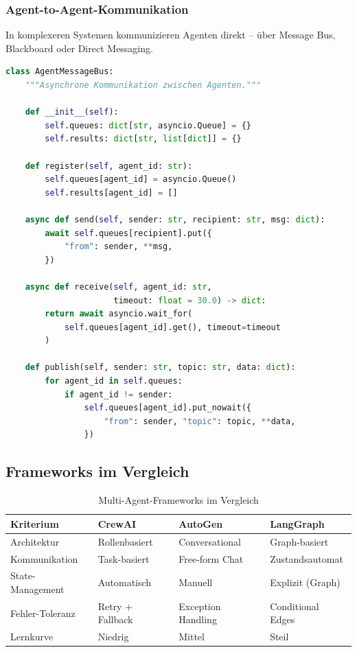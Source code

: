 \subsubsection{Agent-to-Agent-Kommunikation}

In komplexeren Systemen kommunizieren Agenten direkt -- über Message Bus, Blackboard oder Direct Messaging.

\begin{lstlisting}[language=Python, caption=Message-Bus-fuer-Agenten]
class AgentMessageBus:
    """Asynchrone Kommunikation zwischen Agenten."""

    def __init__(self):
        self.queues: dict[str, asyncio.Queue] = {}
        self.results: dict[str, list[dict]] = {}

    def register(self, agent_id: str):
        self.queues[agent_id] = asyncio.Queue()
        self.results[agent_id] = []

    async def send(self, sender: str, recipient: str, msg: dict):
        await self.queues[recipient].put({
            "from": sender, **msg,
        })

    async def receive(self, agent_id: str,
                      timeout: float = 30.0) -> dict:
        return await asyncio.wait_for(
            self.queues[agent_id].get(), timeout=timeout
        )

    def publish(self, sender: str, topic: str, data: dict):
        for agent_id in self.queues:
            if agent_id != sender:
                self.queues[agent_id].put_nowait({
                    "from": sender, "topic": topic, **data,
                })
\end{lstlisting}

\subsection{Frameworks im Vergleich}

\begin{table}[H]
\centering
\begin{tabularx}{\linewidth}{lXXX}
\toprule
\textbf{Kriterium} & \textbf{CrewAI} & \textbf{AutoGen} & \textbf{LangGraph} \\
\midrule
Architektur & Rollenbasiert & Conversational & Graph-basiert \\
Kommunikation & Task-basiert & Free-form Chat & Zustandsautomat \\
State-Management & Automatisch & Manuell & Explizit (Graph) \\
Fehler-Toleranz & Retry + Fallback & Exception Handling & Conditional Edges \\
Lernkurve & Niedrig & Mittel & Steil \\
\bottomrule
\end{tabularx}
\caption{Multi-Agent-Frameworks im Vergleich}
\label{tab:multiframeworks}
\end{table}

